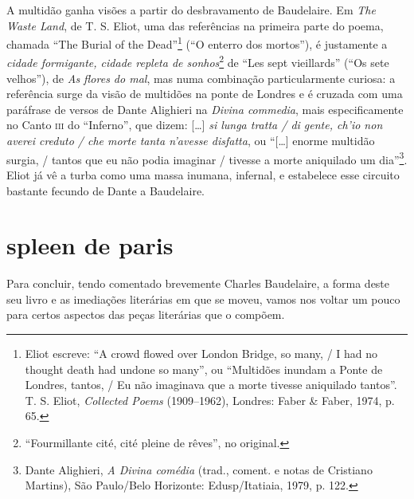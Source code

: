A multidão ganha visões a partir do desbravamento de Baudelaire. Em \textit{The
Waste Land}, de T. S. Eliot, uma das referências na primeira parte do
poema, chamada “The Burial of the Dead”\footnote{ Eliot escreve: “A
crowd flowed over London Bridge, so many, / I had no thought death had
undone so many”, ou “Multidões inundam a Ponte de
Londres, tantos, / Eu não imaginava que a morte tivesse aniquilado
tantos”. T. S. Eliot, \textit{Collected Poems} (1909--1962), Londres: Faber \&
Faber, 1974, p. 65.} (“O enterro dos mortos”), é justamente a
\textit{cidade formigante, cidade repleta de sonhos}\footnote{
“Fourmillante cité, cité pleine de rêves”, no original.} de “Les sept
vieillards” (“Os sete velhos”), de \textit{As flores do mal}, mas numa
combinação particularmente curiosa: a referência surge da visão de
multidões na ponte de Londres e é cruzada com uma paráfrase de versos
de Dante Alighieri na \textit{Divina commedia}, mais especificamente no
Canto \textsc{iii} do “Inferno”, que dizem: […] \textit{ si lunga tratta / di gente,
ch’io non averei creduto / che morte tanta n’avesse disfatta}, ou “[…]
enorme multidão surgia, / tantos que eu não podia imaginar / tivesse a
morte aniquilado um dia”\footnote{ Dante Alighieri,  \textit{A Divina comédia}
(trad., coment. e notas de Cristiano Martins), São Paulo/Belo
Horizonte: Edusp/Itatiaia, 1979, p. 122.}.  Eliot já vê a turba como
uma massa inumana, infernal, e estabelece esse circuito bastante
fecundo de Dante a Baudelaire.

\section*{spleen de paris}
Para concluir, tendo comentado brevemente Charles Baudelaire, a forma
deste seu livro e as imediações literárias em que se moveu, vamos nos
voltar um pouco para certos aspectos das peças literárias que o
compõem. 

